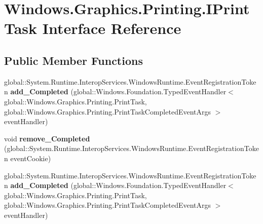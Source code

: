 \hypertarget{interface_windows_1_1_graphics_1_1_printing_1_1_i_print_task}{}\section{Windows.\+Graphics.\+Printing.\+I\+Print\+Task Interface Reference}
\label{interface_windows_1_1_graphics_1_1_printing_1_1_i_print_task}
\subsection*{Public Member Functions}
\begin{DoxyCompactItemize}
\item 
\mbox{\label{interface_windows_1_1_graphics_1_1_printing_1_1_i_print_task_a0c2d1c616b4234ee831091b8f9df376e}} 
global\+::\+System.\+Runtime.\+Interop\+Services.\+Windows\+Runtime.\+Event\+Registration\+Token {\bfseries add\+\_\+\+Completed} (global\+::\+Windows.\+Foundation.\+Typed\+Event\+Handler$<$ global\+::\+Windows.\+Graphics.\+Printing.\+Print\+Task, global\+::\+Windows.\+Graphics.\+Printing.\+Print\+Task\+Completed\+Event\+Args $>$ event\+Handler)
\item 
\mbox{\label{interface_windows_1_1_graphics_1_1_printing_1_1_i_print_task_a5a748e96ef89c22a0070e64b59bab25b}} 
void {\bfseries remove\+\_\+\+Completed} (global\+::\+System.\+Runtime.\+Interop\+Services.\+Windows\+Runtime.\+Event\+Registration\+Token event\+Cookie)
\item 
\mbox{\label{interface_windows_1_1_graphics_1_1_printing_1_1_i_print_task_a0c2d1c616b4234ee831091b8f9df376e}} 
global\+::\+System.\+Runtime.\+Interop\+Services.\+Windows\+Runtime.\+Event\+Registration\+Token {\bfseries add\+\_\+\+Completed} (global\+::\+Windows.\+Foundation.\+Typed\+Event\+Handler$<$ global\+::\+Windows.\+Graphics.\+Printing.\+Print\+Task, global\+::\+Windows.\+Graphics.\+Printing.\+Print\+Task\+Completed\+Event\+Args $>$ event\+Handler)
\item 
\mbox{\label{interface_windows_1_1_graphics_1_1_printing_1_1_i_print_task_a5a748e96ef89c22a0070e64b59bab25b}} 

\end{DoxyCompactItemize}
